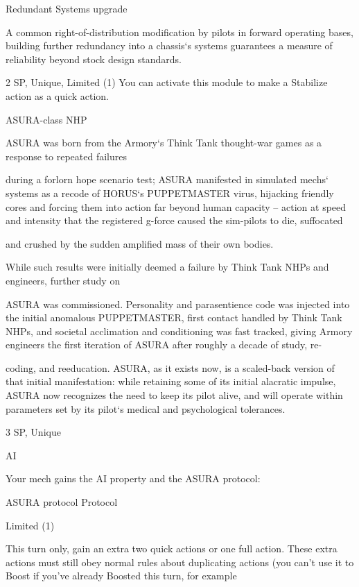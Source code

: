 Redundant Systems upgrade  

A common right-of-distribution modification by pilots in forward operating bases, building further  
redundancy into a chassis‘s systems guarantees a measure of reliability beyond stock design standards.   

2 SP, Unique, Limited (1)  
You can activate this module to make a Stabilize action as a quick action.
 

ASURA-class NHP  

ASURA was born from the Armory‘s Think Tank thought-war games as a response to repeated failures  

during a forlorn hope scenario test; ASURA manifested in simulated mechs‘ systems as a recode of  
HORUS‘s PUPPETMASTER virus, hijacking friendly cores and forcing them into action far beyond human  
capacity -- action at speed and intensity that the registered g-force caused the sim-pilots to die, suffocated  

and crushed by the sudden amplified mass of their own bodies.   

While such results were initially deemed a failure by Think Tank NHPs and engineers, further study on  

ASURA was commissioned. Personality and parasentience code was injected into the initial anomalous  
PUPPETMASTER, first contact handled by Think Tank NHPs, and societal acclimation and conditioning  
was fast tracked, giving Armory engineers the first iteration of ASURA after roughly a decade of study, re- 

coding, and reeducation. ASURA, as it exists now, is a scaled-back version of that initial manifestation:  
while retaining some of its initial alacratic impulse, ASURA now recognizes the need to keep its pilot alive,  
and will operate within parameters set by its pilot‘s medical and psychological tolerances.  

3 SP, Unique
 
AI  

Your mech gains the AI property and the ASURA protocol:
 
         ASURA protocol  
	        Protocol
 
         Limited (1)
 

                                                                                                                   


         This turn only, gain an extra two quick actions or one full action. These extra actions must  
         still obey normal rules about duplicating actions (you can’t use it to Boost if you’ve  
         already Boosted this turn, for example
 
